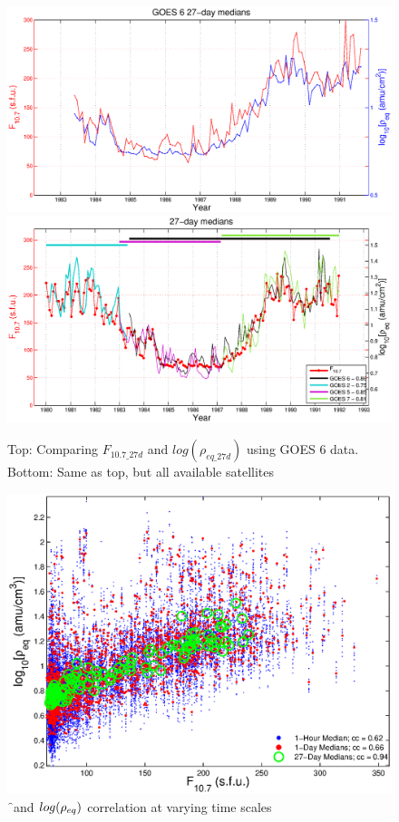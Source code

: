 \begin{figure}[htp!]
	\centering
	\includegraphics[width=0.95\linewidth]{Figures/F107MD27d-GOES6}
	\includegraphics[width=0.95\linewidth]{Figures/F107MD27d-all}
	\caption{Top: Comparing $F_{10.7\_27d}$ and $log(\rho_{eq\_27d})$ using GOES 6 data. Bottom: Same as top, but all available satellites}
	\label{fig:F107rhoeq27dcomparison}
\end{figure}

\begin{figure}[htp!]
	\centering
	\includegraphics[width=0.7\linewidth]{Figures/ccplot-GOES6}
	\caption{\f\ and $log(\rho_{eq})$ correlation at varying time scales}
	\label{fig:ccplot}
\end{figure}


